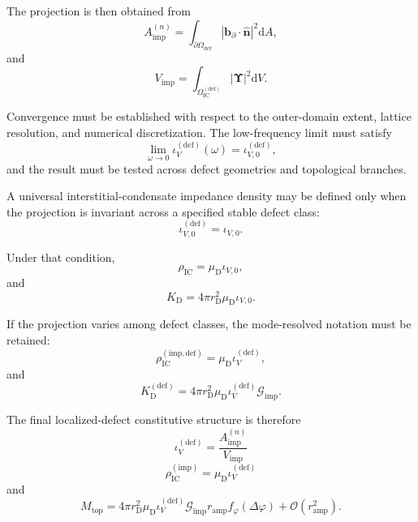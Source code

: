 The projection is then obtained from
\begin{equation}
    A_{\mathrm{imp}}^{(n)} = \int_{\partial\Omega_{\mathrm{def}}} \left| \mathbf{b}_{\partial}\cdot\hat{\mathbf{n}} \right|^2 \mathrm{d}A,
\end{equation}
and
\begin{equation}
    V_{\mathrm{imp}} = \int_{\Omega_{\mathrm{IC}}^{(\mathrm{def})}} |\boldsymbol{\Upsilon}|^2 \mathrm{d}V.
\end{equation}

Convergence must be established with respect to the outer-domain extent, lattice resolution, and numerical discretization. The low-frequency limit must satisfy
\begin{equation}
    \lim_{\omega\rightarrow0} \iota_V^{(\mathrm{def})}(\omega) = \iota_{V,0}^{(\mathrm{def})},
\end{equation}
and the result must be tested across defect geometries and topological branches.

A universal interstitial-condensate impedance density may be defined only when the projection is invariant across a specified stable defect class:
\begin{equation}
    \iota_{V,0}^{(\mathrm{def})} = \iota_{V,0}.
\end{equation}

Under that condition,
\begin{equation}
    \rho_{\mathrm{IC}} = \mu_{\mathrm{D}} \iota_{V,0},
\end{equation}
and
\begin{equation}
    K_{\mathrm{D}} = 4\pi r_{\mathrm{D}}^2 \mu_{\mathrm{D}} \iota_{V,0}.
\end{equation}

If the projection varies among defect classes, the mode-resolved notation must be retained:
\begin{equation}
    \rho_{\mathrm{IC}}^{(\mathrm{imp,def})} = \mu_{\mathrm{D}} \iota_V^{(\mathrm{def})},
\end{equation}
and
\begin{equation}
    K_{\mathrm{D}}^{(\mathrm{def})} = 4\pi r_{\mathrm{D}}^2 \mu_{\mathrm{D}} \iota_V^{(\mathrm{def})} \mathcal{G}_{\mathrm{imp}}.
\end{equation}

The final localized-defect constitutive structure is therefore
\begin{equation}
    \boxed{ \iota_V^{(\mathrm{def})} = \frac{ A_{\mathrm{imp}}^{(n)} }{ V_{\mathrm{imp}} } }
\end{equation}
\begin{equation}
    \boxed{ \rho_{\mathrm{IC}}^{(\mathrm{imp})} = \mu_{\mathrm{D}} \iota_V^{(\mathrm{def})} }
\end{equation}
and
\begin{equation}
    \boxed{ M_{\mathrm{top}} = 4\pi r_{\mathrm{D}}^2 \mu_{\mathrm{D}} \iota_V^{(\mathrm{def})} \mathcal{G}_{\mathrm{imp}} r_{\mathrm{amp}} f_{\varphi}(\Delta\varphi) + \mathcal{O} \left( r_{\mathrm{amp}}^2 \right). }
\end{equation}

